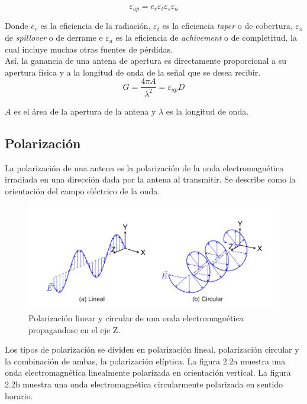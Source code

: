 \begin{equation}
    \varepsilon_{ap} = e_{r} \varepsilon_{t} \varepsilon_{s} \varepsilon_{a}
\end{equation}

Donde $e_{r}$ es la eficiencia de la radiación, $\varepsilon_{t}$ es la eficiencia \textit{taper} o de cobertura, $\varepsilon_{s}$ de \textit{spillover} o de derrame e $\varepsilon_{a}$ es la eficiencia de \textit{achivement} o de completitud, la cual incluye muchas otras fuentes de pérdidas.\\

Así, la ganancia de una antena de apertura es directamente proporcional a su apertura física y a la longitud de onda de la señal que se desea recibir.\\

\begin{equation}
    G = \frac{4\pi A}{\lambda^{2}} = \varepsilon_{ap} D
\end{equation}

$A$ es el área de la apertura de la antena y $\lambda$ es la longitud de onda.\\

\subsection{Polarización}

La polarización de una antena es la polarización de la onda electromagnética irradiada en una dirección dada por la antena al transmitir. Se describe como la orientación del campo eléctrico de la onda.\\

\begin{figure}
    \centering
    \includegraphics[width = 0.8\linewidth]{img/pol}
    \caption{Polarización linear y circular de una onda electromagnética propagandose en el eje Z.}
    \label{fig:polarizacion2}
\end{figure}

Los tipos de polarización se dividen en polarización lineal, polarización circular y la combinación de ambas, la polarización elíptica. La figura 2.2a muestra una onda electromagnética linealmente polarizada en orientación vertical. La figura 2.2b muestra una onda electromagnética circularmente polarizada en sentido horario.\\



